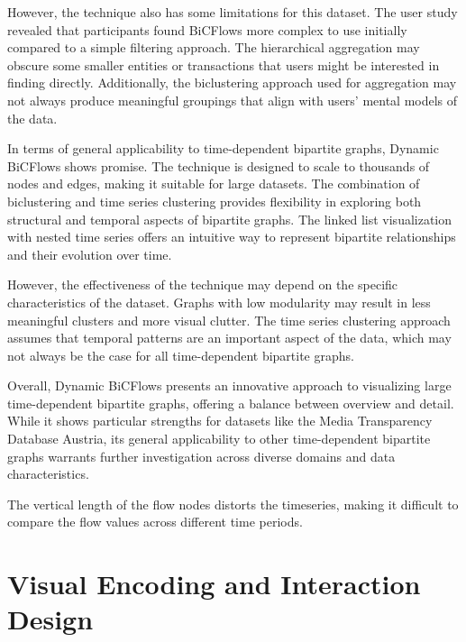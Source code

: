 \documentclass{vgtc}
\begin{document}
However, the technique also has some limitations for this dataset. The user study revealed that participants found BiCFlows more complex to use initially compared to a simple filtering approach. The hierarchical aggregation may obscure some smaller entities or transactions that users might be interested in finding directly. Additionally, the biclustering approach used for aggregation may not always produce meaningful groupings that align with users' mental models of the data.

In terms of general applicability to time-dependent bipartite graphs, Dynamic BiCFlows shows promise. The technique is designed to scale to thousands of nodes and edges, making it suitable for large datasets. The combination of biclustering and time series clustering provides flexibility in exploring both structural and temporal aspects of bipartite graphs. The linked list visualization with nested time series offers an intuitive way to represent bipartite relationships and their evolution over time.

However, the effectiveness of the technique may depend on the specific characteristics of the dataset. Graphs with low modularity may result in less meaningful clusters and more visual clutter. The time series clustering approach assumes that temporal patterns are an important aspect of the data, which may not always be the case for all time-dependent bipartite graphs.

Overall, Dynamic BiCFlows presents an innovative approach to visualizing large time-dependent bipartite graphs, offering a balance between overview and detail. While it shows particular strengths for datasets like the Media Transparency Database Austria, its general applicability to other time-dependent bipartite graphs warrants further investigation across diverse domains and data characteristics.


The vertical length of the flow nodes distorts the timeseries, making it difficult to compare the flow values across different time periods.



















\section{Visual Encoding and Interaction Design} %
\end{document}
